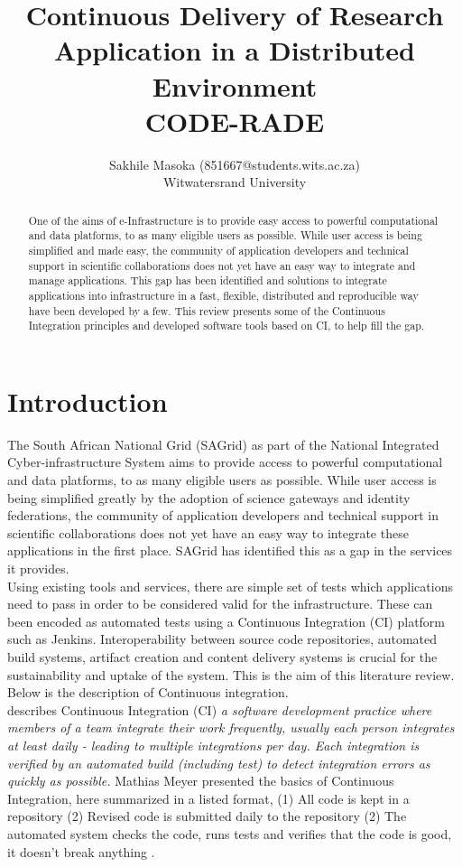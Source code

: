 \documentclass [titlepage,11pt]{article}
\title{\Huge Continuous Delivery of Research Application in a Distributed Environment \\\medskip CODE-RADE}
\author{Sakhile Masoka (851667@students.wits.ac.za)\\Witwatersrand University}
\begin{document}
\maketitle

\tableofcontents{}


\begin{abstract}
One of the aims of e-Infrastructure is to provide easy access to powerful computational and data platforms, to as many eligible users as possible. While user access is being simplified and made easy, the community of application developers and technical support in scientific collaborations does not yet have an easy way to integrate and manage applications. This gap has been identified and solutions to integrate applications into infrastructure in a fast, flexible, distributed and reproducible way have been developed by a few. This review presents some of the Continuous Integration principles and developed software tools based on CI, to help fill the gap.
\end{abstract}


\section{Introduction}

The South African National Grid (SAGrid) as part of the National Integrated Cyber-infrastructure System aims to provide access to powerful computational and data platforms, to as many eligible users as possible. While user access is being simplified greatly by the adoption of science gateways and identity federations, the community of application developers and technical support in scientific collaborations does not yet have an easy way to integrate these applications in the first place. SAGrid has identified this as a gap in the services it provides. \\

Using existing tools and services, there are simple set of tests which applications need to pass in order to be considered valid for the infrastructure. These can been encoded as automated tests using a Continuous Integration (CI) platform such as Jenkins. Interoperability between source code repositories, automated build systems, artifact creation and content delivery systems is crucial for the sustainability and uptake of the system. This is the aim of this literature review. Below is the description of Continuous integration. \\

\citep{fowler06} describes Continuous Integration (CI) {\it a software development practice where members of a team integrate their work frequently, usually each person integrates at least daily - leading to multiple integrations per day. Each integration is verified by an automated build (including test) to detect integration errors as quickly as possible.} Mathias Meyer presented the basics of Continuous Integration, here summarized in a listed format, (1) All code is kept in a repository (2) Revised code is submitted daily to the repository (2) The automated system checks the code, runs tests and verifies that the code is good, it doesn't break anything \citep{meyer14}. \\
\end{document}
